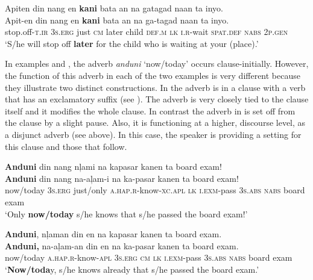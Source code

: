 \ea
\label{bkm:Ref329779114}
Apiten  din  nang  en  \textbf{kani}  bata  an  na  gatagad  naan  ta  inyo. \\\smallskip
 \gll Apit-en  din  nang  en  \textbf{kani}  bata  an  na  ga-tagad  naan  ta  inyo. \\
stop.off\textsc{-t.ir}  3\textsc{s.erg}  just  \textsc{cm}  later  child  \textsc{def.m}  \textsc{lk}  \textsc{i.r}-wait  \textsc{spat.def}  \textsc{nabs}  2\textsc{p.gen} \\
\glt ‘S/he will stop off \textbf{later} for the child who is waiting at your (place).’
\z

In examples  and , the adverb \textit{anduni} ‘now/today’ occurs clause-ini\-tial\-ly. However, the function of this adverb in each of the two examples is very different because they illustrate two distinct constructions. In  the adverb is in a clause with a verb that has an exclamatory suffix (see  ). The adverb is very closely tied to the clause itself and it modifies the whole clause. In contrast the adverb in  is set off from the clause by a slight pause. Also, it is functioning at a higher, discourse level, as a disjunct adverb (see  above). In this case, the speaker is providing a setting for this clause and those that follow.

\ea
\label{bkm:Ref329779247}
\textbf{Anduni}  din  nang  nļami  na  kapasar  kanen ta  board exam! \\\smallskip
 \gll \textbf{Anduni}  din  nang  na-aļam-i  na  ka-pasar  kanen ta  board exam! \\
now/today  3\textsc{s.erg}  just/only  \textsc{a.hap.r}-know-\textsc{xc.apl}  \textsc{lk}  \textsc{i.exm}-pass  3\textsc{s.abs}
 \textsc{nabs}  board exam \\
\glt `Only \textbf{now/today} s/he knows that s/he passed the board exam!’
\z

\newpage

\ea
\label{bkm:Ref329779234}
\textbf{Anduni},  nļaman  din  en  na  kapasar  kanen ta board exam. \\\smallskip
 \gll \textbf{Anduni,}  na-aļam-an  din  en  na  ka-pasar  kanen ta board exam. \\
now/today  \textsc{a.hap.r}-know-\textsc{apl}  3\textsc{s.erg}  \textsc{cm}  \textsc{lk}  \textsc{i.exm}-pass  3\textsc{s.abs}
\textsc{nabs} board exam \\
\glt `\textbf{Now/toda}y, s/he knows already that s/he passed the board exam.’
\z

